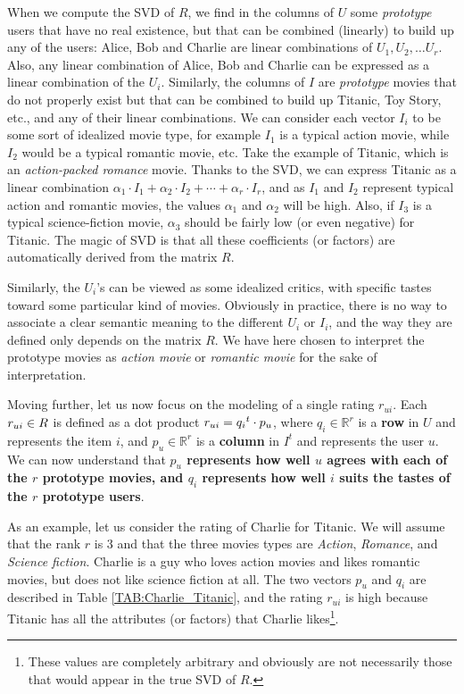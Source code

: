 When we compute the SVD of $R$, we find in the columns of $U$ some
\textit{prototype} users that have no real existence, but that can be combined
(linearly) to build up any of the users: Alice, Bob and Charlie are linear
combinations of $U_1, U_2, \dots U_r$. Also, any linear combination of Alice,
Bob and Charlie can be expressed as a linear combination of the $U_i$. Similarly, the columns of $I$ are
\textit{prototype} movies that do not properly exist but that can be combined
to build up Titanic, Toy Story, etc., and any of their linear combinations. We can consider each vector $I_i$
to be some sort of idealized movie type, for example $I_1$ is a typical action
movie, while $I_2$ would be a typical romantic movie, etc. Take the example of
Titanic, which is an \textit{action-packed romance} movie. Thanks to the SVD,
we can express Titanic  as a linear combination $\alpha_1 \cdot I_1 + \alpha_2
\cdot I_2 + \cdots + \alpha_r \cdot I_r$, and as $I_1$ and $I_2$ represent
typical action and romantic movies, the values $\alpha_1$ and $\alpha_2$
will be high. Also, if
$I_3$ is a typical science-fiction movie, $\alpha_3$ should be fairly low (or
even negative) for Titanic. The magic of SVD is that all these coefficients (or factors)
are automatically derived from the matrix $R$.

Similarly, the $U_i$'s can be viewed as some idealized critics, with specific
tastes toward some particular kind of movies. Obviously in practice, there is
no way to associate a clear semantic meaning to the different $U_i$ or $I_i$,
and the way they are defined only depends on the matrix $R$. We have here
chosen to interpret the prototype movies as \textit{action movie} or
\textit{romantic movie} for the sake of interpretation.

Moving further, let us now focus on the modeling of a single rating $r_{ui}$.
Each $r_{ui} \in R$ is defined as a dot product $r_{ui} =
{q_i}^t \cdot p_u$, where $q_i \in \mathbb{R}^r$ is a \textbf{row} in $U$ and represents
the item $i$, and $p_u \in \mathbb{R}^r$ is a \textbf{column} in $I^t$ and represents the
user $u$. We can now understand that \textbf{$p_u$ represents how well $u$
agrees with each of the $r$ prototype movies, and $q_i$ represents how well $i$
suits the tastes of the $r$ prototype users}.

\begin{testexample}
As an example, let us consider the rating of Charlie for Titanic. We will
assume that the rank $r$ is $3$ and that the three movies types are
\textit{Action}, \textit{Romance}, and \textit{Science fiction}. Charlie is a
guy who loves action movies and likes romantic movies, but does not like
science fiction at all. The two vectors $p_u$ and $q_i$ are described in Table
\ref{TAB:Charlie_Titanic}, and the rating $r_{ui}$ is high because Titanic
has all the attributes (or factors) that Charlie likes\footnote{These values
are completely arbitrary and obviously are not necessarily those that would
appear in the true SVD of $R$.}.
\end{testexample}

